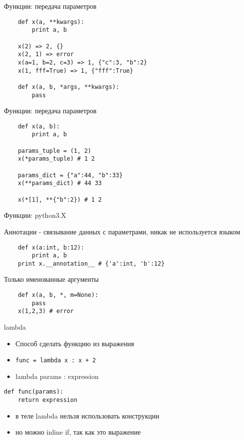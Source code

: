 \documentclass{article}
\begin{document}
\begin{center} Функции: передача параметров \end{center}
\vspace{15pt}
\begin{lstlisting}
    def x(a, **kwargs):
        print a, b

    x(2) => 2, {}
    x(2, 1) => error
    x(a=1, b=2, c=3) => 1, {"c":3, "b":2}
    x(1, fff=True) => 1, {"fff":True}

    def x(a, b, *args, **kwargs):
        pass
\end{lstlisting}
\newpage

\begin{center} Функции: передача параметров \end{center}
\vspace{15pt}
\begin{lstlisting}
    def x(a, b):
        print a, b

    params_tuple = (1, 2)
    x(*params_tuple) # 1 2

    params_dict = {"a":44, "b":33}
    x(**params_dict) # 44 33

    x(*[1], **{"b":2}) # 1 2
\end{lstlisting}
\newpage

\begin{center} Функции: python3.X \end{center}
\vspace{15pt}
Аннотации - связывание данных с параметрами, никак не используется языком
\begin{lstlisting}
    def x(a:int, b:12):
        print a, b
    print x.__annotation__ # {'a':int, 'b':12}
\end{lstlisting}
Только именованные аргументы
\begin{lstlisting}
    def x(a, b, *, m=None):
        pass
    x(1,2,3) # error
\end{lstlisting}
\newpage

\begin{center} lambda \end{center}

\begin{itemize}
    \item Способ сделать функцию из выражения
    \item \lstinline!func = lambda x : x + 2!
    \item lambda params : expression 
\end{itemize}
\begin{lstlisting}
def func(params):
    return expression
\end{lstlisting}
\begin{itemize}
    \item в теле lambda нельзя использовать конструкции
    \item но можно inline if, так как это выражение
\end{itemize}
\newpage 
\end{document}
